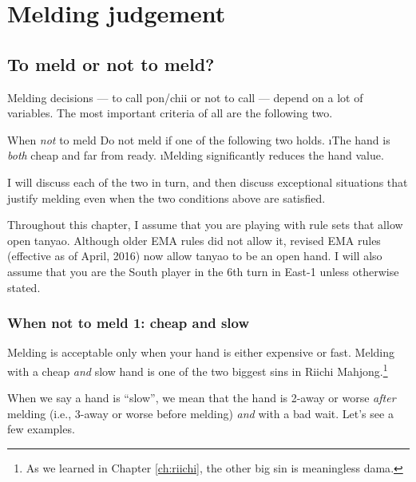 
\chapter{Melding judgement} \label{ch:call}
\thispagestyle{fancy}

\section{To meld or not to meld?}

Melding decisions --- to call {\jap pon}/{\jap chii} or not to call --- depend on a lot of variables. The most important criteria of all are the following two. 

\bigskip
\begin{itembox}[c]{When \emph{not} to meld}
Do not meld if one of the following two holds.
\be
\i The hand is \emph{both} cheap and far from ready.
\i Melding significantly reduces the hand value.
\ee
\end{itembox}

\bigskip
I will discuss each of the two in turn, and then discuss exceptional situations that justify melding even when the two conditions above are satisfied. 

\bigskip
Throughout this chapter, I assume that you are playing with rule sets that allow open {\jap tanyao}. Although older EMA rules did not allow it, revised EMA rules (effective as of April, 2016) now allow {\jap tanyao} to be an open hand. 
I will also assume that you are the South player in the 6th turn in East-1 unless otherwise stated. 

\subsection{When not to meld 1: cheap and slow}
Melding is acceptable only when your hand is either expensive or fast. 
Melding with a cheap \emph{and} slow hand is one of the two biggest sins in Riichi Mahjong.\footnote{As we learned in Chapter \ref{ch:riichi}, the other big sin is meaningless {\jap dama}.} 

\bigskip
When we say a hand is ``slow'', we mean that the hand is 2-away or worse \emph{after} melding (i.e., 3-away or worse before melding) \emph{and} with a bad wait. Let's see a few examples. 

